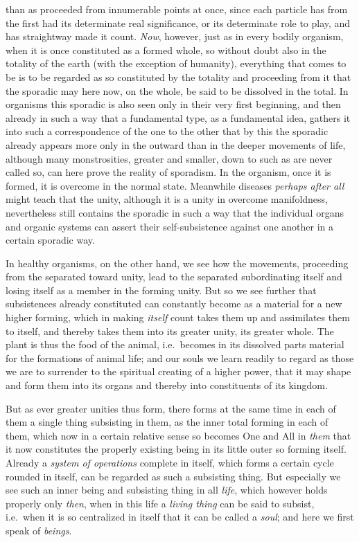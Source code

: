 \documentclass[12pt,a4paper,openany]{book}
\newcommand{\opage}[1]{\marginnote{\footnotesize\textit{[#1]}}}
\begin{document}
than as proceeded from innumerable points at once, since each particle has from the
first had its determinate real significance, or its determinate role to play, and has
straightway made it count. \emph{Now}, however, just as in every bodily organism, when it is
once constituted as a formed whole, so without doubt also in the totality of the
earth (with the exception of humanity), everything that comes to be is to be regarded
as so constituted by the totality and proceeding from it that the sporadic may here
now, on the whole, be said to be dissolved in the total. In organisms this sporadic
is also seen only in their very first beginning, and then already in such a way that
a fundamental type, as a fundamental idea, gathers it into such a correspondence of
the one to the other that by this the sporadic already appears more only in the
outward than in the deeper movements of life, although many monstrosities, greater
and smaller, down to such as are never called so, can here prove the reality of
sporadism. In the organism, once it is formed, it is overcome in the normal state.
Meanwhile diseases \emph{perhaps after all} might teach that the unity, although it
is a unity in overcome manifoldness, nevertheless still contains the sporadic in such
a way that the individual organs and organic systems can assert their self-subsistence
against one another in a certain sporadic way.

In healthy organisms, on the other hand, we see how the movements, proceeding from
the separated toward unity, lead to the separated subordinating itself and losing
itself as a member in the forming unity. But so we see further that subsistences
already constituted can constantly become as a material for a new higher forming,
which in making \emph{itself} count takes them up and assimilates them to itself, and
thereby takes them into
\setcounter{footnote}{0}%
\opage{130}its greater unity, its greater whole. The plant is thus the food of the animal,
i.e.\ becomes in its dissolved parts material for the formations of animal life; and
our souls we learn readily to regard as those we are to surrender to the spiritual
creating of a higher power, that it may shape and form them into its organs and
thereby into constituents of its kingdom.

But as ever greater unities thus form, there forms at the same time in each of them
a single thing subsisting in them, as the inner total forming in each of them, which
now in a certain relative sense so becomes One and All in \emph{them} that it now
constitutes the properly existing being in its little outer so forming itself.
Already a \emph{system of operations} complete in itself, which forms a
certain cycle rounded in itself, can be regarded as such a subsisting thing. But
especially we see such an inner being and subsisting thing in all \emph{life}, which
however holds properly only \emph{then}, when in this life a \emph{living thing} can
be said to subsist, i.e.\ when it is so centralized in itself that it can be called a
\emph{soul}; and here we first speak of \emph{beings}.
\end{document}
